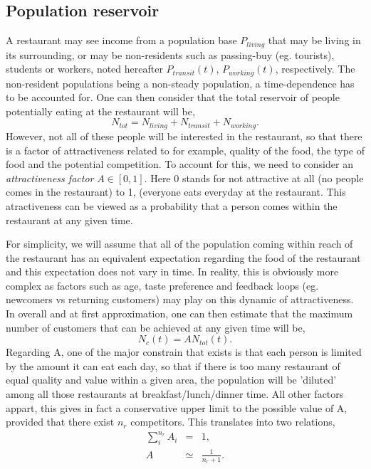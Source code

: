 \documentclass{article}
\begin{document}
    \subsection{Population reservoir} \label{sec:2:1}
A restaurant may see income from a population base $P_{living}$ that may be living in its surrounding, or may be non-residents such as passing-buy (eg. tourists), students or workers, noted hereafter $P_{transit}(t)$, $P_{working}(t)$, respectively.  The non-resident populations being a non-steady population, a time-dependence has to be accounted for.
One can then consider that the total reservoir of people potentially eating at the restaurant will be,
\begin{equation} \label{eq:Ntot}
    N_{tot} = N_{living} + N_{transit} + N_{working}.
\end{equation}
However, not all of these people will be interested in the restaurant, so that there is a factor of attractiveness related to for example, quality of the food, the type of food and the potential competition. To account for this, we need to consider an {\it attractiveness factor} $A \in [0,1]$. Here 0 stands for not attractive at all (no people comes in the restaurant) to 1, (everyone eats everyday at the restaurant. This atractiveness can be viewed as a probability that a person comes within the restaurant at any given time.   

For simplicity, we will assume that all of the population coming within reach of the restaurant has an equivalent expectation regarding the food of the restaurant and this expectation does not vary in time. In reality, this is obviously more complex as factors such as age, taste preference and feedback loops (eg. newcomers vs returning customers) may play on this dynamic of attractiveness.
In overall and at first approximation, one can then estimate that the maximum number of customers that can be achieved at any given time will be,
\begin{equation} \label{eq:Nmax}
    N_{c} (t) = A N_{tot} (t).
\end{equation}
Regarding A, one of the major constrain that exists is that each person is limited by the amount it can eat each day, so that if there is too many restaurant of equal quality and value within a given area, the population will be 'diluted' among all those restaurants at breakfast/lunch/dinner time. All other factors appart, this gives in fact a conservative upper limit to the possible value of A, provided that there exist $n_r$ competitors. This translates into two relations,
\begin{eqnarray}
    \sum^{n_r}_i A_i &=& 1, \\
     A &\simeq&  \frac{1}{n_r+1}. 
\end{eqnarray}
\end{document}
